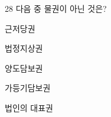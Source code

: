 \begin{question}{28}
다음 중 물권이 아닌 것은?
\begin{choices}
  \item 근저당권
  \item 법정지상권
  \item 양도담보권
  \item 가등기담보권
  \item 법인의 대표권
\end{choices}
\end{question}
